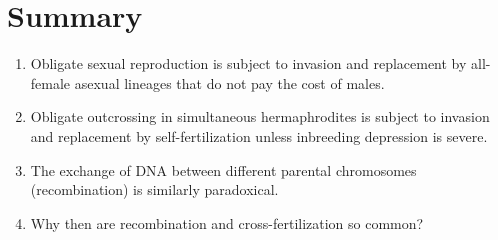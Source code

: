\documentclass[
  letterpaper,
]{book}
\providecommand{\tightlist}{%
  \setlength{\itemsep}{0pt}\setlength{\parskip}{0pt}}\usepackage{longtable,booktabs,array}
\begin{document}
\section{Summary}\label{summary}

\begin{enumerate}
\def\labelenumi{\arabic{enumi}.}
\tightlist
\item
  Obligate sexual reproduction is subject to invasion and replacement by
  all-female asexual lineages that do not pay the cost of males.
\item
  Obligate outcrossing in simultaneous hermaphrodites is subject to
  invasion and replacement by self-fertilization unless inbreeding
  depression is severe.
\item
  The exchange of DNA between different parental chromosomes
  (recombination) is similarly paradoxical.
\item
  Why then are recombination and cross-fertilization so common?
\end{enumerate}
\end{document}
